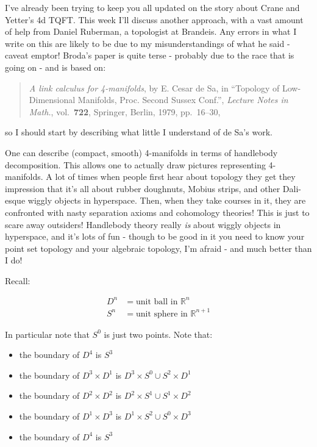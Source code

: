 \documentclass{article}
\def\tightlist{}
\begin{document}
I've already been trying to keep you all updated on the story about
Crane and Yetter's 4d TQFT. This week I'll discuss another approach,
with a vast amount of help from Daniel Ruberman, a topologist at
Brandeis. Any errors in what I write on this are likely to be due to my
misunderstandings of what he said - caveat emptor! Broda's paper is
quite terse - probably due to the race that is going on - and is based
on:

\begin{quote}
\emph{A link calculus for 4-manifolds}, by E. Cesar de Sa, in ``Topology
of Low-Dimensional Manifolds, Proc. Second Sussex Conf.'', \emph{Lecture
Notes in Math.}, vol.~\textbf{722}, Springer, Berlin, 1979, pp.~16--30,
\end{quote}

so I should start by describing what little I understand of de Sa's
work.

One can describe (compact, smooth) 4-manifolds in terms of handlebody
decomposition. This allows one to actually draw pictures representing
4-manifolds. A lot of times when people first hear about topology they
get they impression that it's all about rubber doughnuts, Mobius strips,
and other Dali-esque wiggly objects in hyperspace. Then, when they take
courses in it, they are confronted with nasty separation axioms and
cohomology theories! This is just to scare away outsiders! Handlebody
theory really \emph{is} about wiggly objects in hyperspace, and it's
lots of fun - though to be good in it you need to know your point set
topology and your algebraic topology, I'm afraid - and much better than
I do!

Recall:

\[\begin{aligned}D^n &= \mbox{unit ball in $\mathbb{R}^n$} \\ S^n &= \mbox{unit sphere in $\mathbb{R}^{n+1}$}\end{aligned}\]

In particular note that \(S^0\) is just two points. Note that:

\begin{itemize}
\tightlist
\item
  the boundary of \(D^4\) is \(S^3\)
\item
  the boundary of \(D^3 \times D^1\) is
  \(D^3 \times S^0 \cup S^2 \times D^1\)
\item
  the boundary of \(D^2 \times D^2\) is
  \(D^2 \times S^1 \cup S^1 \times D^2\)
\item
  the boundary of \(D^1 \times D^3\) is
  \(D^1 \times S^2 \cup S^0 \times D^3\)
\item
  the boundary of \(D^4\) is \(S^3\)
\end{itemize}
\end{document}
